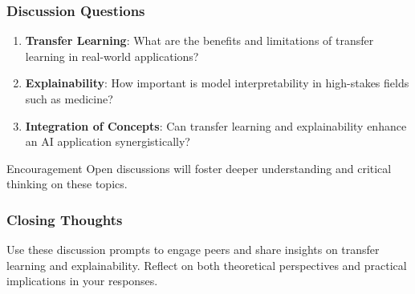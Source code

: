 \documentclass[aspectratio=169]{beamer}
\begin{document}
\begin{frame}[fragile]
    \frametitle{Discussion Questions}
    \begin{enumerate}
        \item \textbf{Transfer Learning}:
            What are the benefits and limitations of transfer learning in real-world applications?
        \item \textbf{Explainability}:
            How important is model interpretability in high-stakes fields such as medicine?
        \item \textbf{Integration of Concepts}:
            Can transfer learning and explainability enhance an AI application synergistically?
    \end{enumerate}
    
    \begin{block}{Encouragement}
        Open discussions will foster deeper understanding and critical thinking on these topics.
    \end{block}
\end{frame}

\begin{frame}[fragile]
    \frametitle{Closing Thoughts}
    Use these discussion prompts to engage peers and share insights on transfer learning and explainability.
    Reflect on both theoretical perspectives and practical implications in your responses.
\end{frame}
\end{document}
